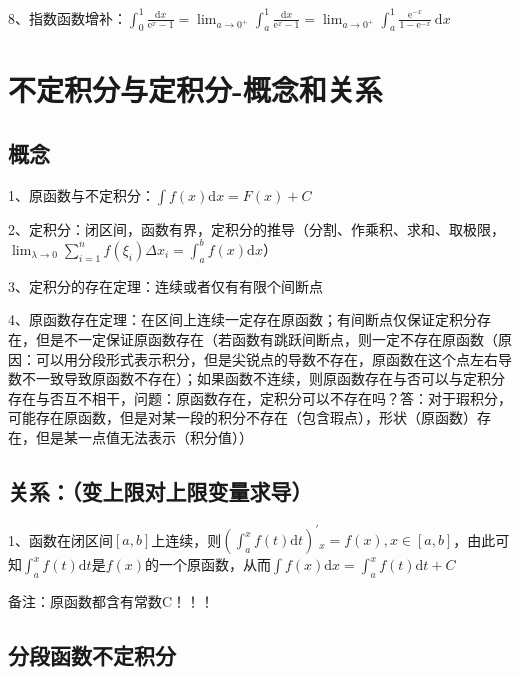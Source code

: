 8、指数函数增补：$ \int_{0}^{1} \frac{\mathrm{d} x}{\mathrm{e}^{x}-1}=\lim _{a \rightarrow 0^{+}} \int_{a}^{1} \frac{\mathrm{d} x}{\mathrm{e}^{x}-1}=\lim _{a \rightarrow 0^{+}} \int_{a}^{1} \frac{\mathrm{e}^{-x}}{1-\mathrm{e}^{-x}} \mathrm{~d} x $

\section{不定积分与定积分-概念和关系}



\subsection{概念}

1、原函数与不定积分：$ \int f(x) \mathrm{d} x=F(x)+C $

2、定积分：闭区间，函数有界，定积分的推导（分割、作乘积、求和、取极限，$ \lim _{\lambda \rightarrow 0} \sum_{i=1}^{n} f\left(\xi_{i}\right) \Delta x_{i}=\int_{a}^{b} f(x) \mathrm{d} x $）

3、定积分的存在定理：连续或者仅有有限个间断点

4、原函数存在定理：在区间上连续一定存在原函数；有间断点仅保证定积分存在，但是不一定保证原函数存在（若函数有跳跃间断点，则一定不存在原函数（原因：可以用分段形式表示积分，但是尖锐点的导数不存在，原函数在这个点左右导数不一致导致原函数不存在）；如果函数不连续，则原函数存在与否可以与定积分存在与否互不相干，问题：原函数存在，定积分可以不存在吗？答：对于瑕积分，可能存在原函数，但是对某一段的积分不存在（包含瑕点），形状（原函数）存在，但是某一点值无法表示（积分值））



\subsection{关系：（变上限对上限变量求导）}

1、函数在闭区间$ [a,b] $上连续，则$ \left(\int_{a}^{x} f(t) \mathrm{d} t\right)^{\prime}{ }_{x}=f(x), x \in[a, b] $，由此可知$ \int_{a}^{x} f(t) \mathrm{d} t $是$ f(x) $的一个原函数，从而$ \int f(x) \mathrm{d} x=\int_{a}^{x} f(t) \mathrm{d} t+C $

备注：原函数都含有常数C！！！



\subsection{分段函数不定积分}


